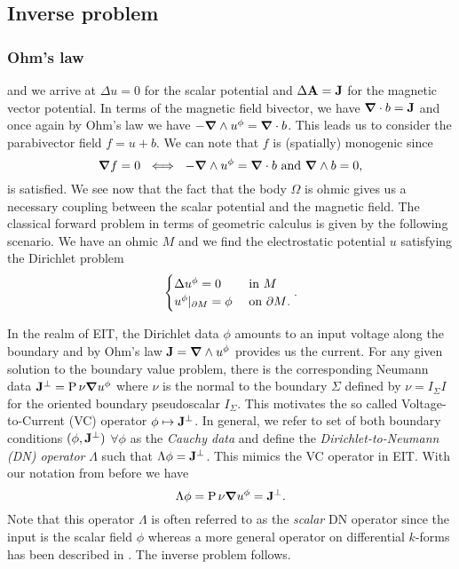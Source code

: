 \subsection{Inverse problem}

\subsubsection{Ohm's law}
and we arrive at $\Delta u = 0$ for the scalar potential and $\Delta \mathbf{A} = \mathbf{J}$ for the magnetic vector potential. In terms of the magnetic field bivector, we have $\boldsymbol{\nabla} \cdot b = \mathbf{J}$ and once again by Ohm's law we have $-\boldsymbol{\nabla} \wedge u^\phi = \boldsymbol{\nabla} \cdot b$. This leads us to consider the parabivector field $f=u+b$. We can note that $f$ is (spatially) monogenic since 
\[
\boldsymbol{\nabla} f = 0 ~\iff~ -\boldsymbol{\nabla} \wedge u^\phi =  \boldsymbol{\nabla} \cdot b ~\textrm{and}~ \boldsymbol{\nabla} \wedge b = 0,
\]
is satisfied. We see now that the fact that the body $\Omega$ is ohmic gives us a necessary coupling between the scalar potential and the magnetic field.
The classical forward problem in terms of geometric calculus is given by the following scenario. We have an ohmic $M$ and we find the electrostatic potential $u$ satisfying the Dirichlet problem
\begin{equation}
\label{eq:dirichlet_problem}
\begin{cases} \Delta u^\phi = 0 & \textrm{ in $M$} \\  u^\phi \vert_{{\partial M}} = \phi & \textrm{ on ${\partial M}$}. \end{cases}.
\end{equation}

In the realm of EIT, the Dirichlet data $\phi$ amounts to an input voltage along the boundary and by Ohm's law $\mathbf{J}=\boldsymbol{\nabla} \wedge u^\phi$ provides us the current. For any given solution to the boundary value problem, there is the corresponding Neumann data $\mathbf{J}^\perp=\operatorname{P}{\nu}{\boldsymbol{\nabla} u^\phi}$ where $\nu$ is the normal to the boundary $\Sigma$ defined by $\nu = I_\Sigma I$ for the oriented boundary pseudoscalar $I_\Sigma$. This motivates the so called Voltage-to-Current (VC) operator $\phi \mapsto \mathbf{J}^\perp$. In general, we refer to set of both boundary conditions $(\phi, \mathbf{J}^\perp)$ $\forall \phi$ as the \emph{Cauchy data} and define the \emph{Dirichlet-to-Neumann (DN) operator} $\Lambda$ such that $\Lambda \phi = \mathbf{J}^\perp$. This mimics the VC operator in EIT. With our notation from before we have
\[
\Lambda \phi = \operatorname{P}{\nu}{\boldsymbol{\nabla} u^\phi} = \mathbf{J}^\perp.
\] 
Note that this operator $\Lambda$ is often referred to as the \emph{scalar} DN operator since the input is the scalar field $\phi$ whereas a more general operator on differential $k$-forms has been described in \cite{belishev_dirichlet_2008,sharafutdinov_complete_2013}. The inverse problem follows.

